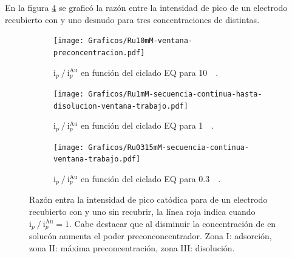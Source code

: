 	    En la figura \ref{fig:ventanas} se graficó la razón entre la intensidad de pico de un electrodo recubierto con \pdmF\space y uno desnudo para tres concentraciones de \ru\space distintas. 

	    	\vspace*{-4mm}
	    	\begin{figure}[h!]
	 	   	    \begin{subfigure}[t]{0.495\textwidth}
		        	\texttt{[image: Graficos/Ru10mM-ventana-preconcentracion.pdf]}
		       		\vspace*{-0.3cm}
		       		\caption{$\text{i}_p\mathbin{/}\text{i}_p^{\text{Au}}$ en función del ciclado EQ para \ru\space \SI{10}{\milli\Molar}.}
		         	\label{fig:Ventana_Ru10mM}
		     		\end{subfigure}
	     		\begin{subfigure}[t]{0.495\textwidth}
		        	\texttt{[image: Graficos/Ru1mM-secuencia-continua-hasta-disolucion-ventana-trabajo.pdf]}
		       		\vspace*{-0.3cm}
		       		\caption{$\text{i}_p\mathbin{/}\text{i}_p^{\text{Au}}$ en función del ciclado EQ para \ru\space \SI{1}{\milli\Molar}.}
		         	\label{fig:Ventana_Ru1mM}
		     		\end{subfigure}
	     		\begin{center}
	     		\begin{subfigure}[t]{0.495\textwidth}
		        	\vspace*{-0.3cm}
		        	\texttt{[image: Graficos/Ru0315mM-secuencia-continua-ventana-trabajo.pdf]}
		       		\vspace*{-0.3cm}
		       		\caption{$\text{i}_p\mathbin{/}\text{i}_p^{\text{Au}}$ en función del ciclado EQ para \ru\space \SI{0.3}{\milli\Molar}.}
		         	\label{fig:Ventana_Ru0315mM}
		     		\end{subfigure}
		     		\end{center}
	 	   	   \vspace*{-0.5cm}
	 	   	   	\caption[Intensidad en función del ciclado EQ para \pdmF]{Razón entra la intensidad de pico catódica para \ru\space de un electrodo recubierto con \pdm\space y uno sin recubrir, la línea roja indica cuando $\text{i}_p\mathbin{/}\text{i}_p^{\text{Au}} = 1$. Cabe destacar que al disminuir la concentración de \ru\space en solucón aumenta el poder preconconcentrador. Zona I: adsorción, zona II: máxima preconcentración, zona III: disolución.}
	     		\label{fig:ventanas}
	     	  \end{figure}

